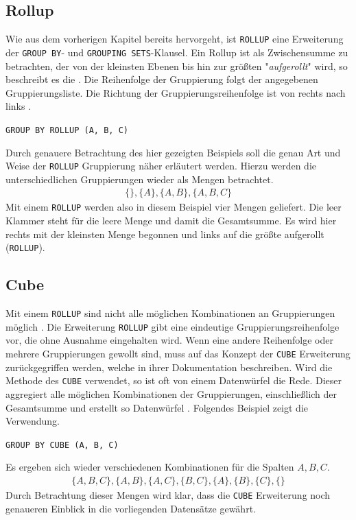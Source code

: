 
\subsection{Rollup}
\label{subsec:rollup} Wie aus dem vorherigen Kapitel bereits hervorgeht, ist \texttt{ROLLUP}
eine Erweiterung der \texttt{GROUP BY}- und \texttt{GROUPING SETS}-Klausel. Ein
Rollup ist als Zwischensumme zu betrachten, der von der kleinsten Ebenen bis hin
zur größten "\textit{aufgerollt}" wird, so beschreibt es die \citet[K. 20]{oracle99}.
Die Reihenfolge der Gruppierung folgt der angegebenen Gruppierungsliste. Die
Richtung der Gruppierungsreihenfolge ist von rechts nach links \citep[vgl.][]{oracle16}.
\begin{center}
	\texttt{GROUP BY ROLLUP (A, B, C)}
\end{center}
Durch genauere Betrachtung des hier gezeigten Beispiels soll die genau Art und
Weise der \texttt{ROLLUP} Gruppierung näher erläutert werden. Hierzu werden die
unterschiedlichen Gruppierungen wieder als Mengen betrachtet.
\begin{align*}
	\{ \}, \{A\}, \{A, B\}, \{A, B, C\}
\end{align*}
Mit einem \texttt{ROLLUP} werden also in diesem Beispiel vier Mengen geliefert. Die
leer Klammer steht für die leere Menge und damit die Gesamtsumme. Es wird hier
rechts mit der kleinsten Menge begonnen und links auf die größte aufgerollt (\texttt{ROLLUP}).

\subsection{Cube}
\label{subsec:cube} Mit einem \texttt{ROLLUP} sind nicht alle möglichen
Kombinationen an Gruppierungen möglich \citep[vgl.][K. 20]{oracle99}. Die
Erweiterung \texttt{ROLLUP} gibt eine eindeutige Gruppierungsreihenfolge vor,
die ohne Ausnahme eingehalten wird. Wenn eine andere Reihenfolge oder mehrere Gruppierungen
gewollt sind, muss auf das Konzept der \texttt{CUBE} Erweiterung zurückgegriffen
werden, welche \citet[K. 20]{oracle99} in ihrer Dokumentation beschreiben. Wird
die Methode des \texttt{CUBE} verwendet, so ist oft von einem Datenwürfel die
Rede. Dieser aggregiert alle möglichen Kombinationen der Gruppierungen,
einschließlich der Gesamtsumme und erstellt so Datenwürfel \citep[vgl.][K. 20]{oracle99}.
Folgendes Beispiel zeigt die Verwendung.
\begin{center}
	\texttt{GROUP BY CUBE (A, B, C)}
\end{center}
Es ergeben sich wieder verschiedenen Kombinationen für die Spalten $A, B, C$.
\begin{align*}
	\{ A, B, C\}, \{A, B\}, \{A, C\}, \{B, C\}, \{A\}, \{B\}, \{C\}, \{ \}
\end{align*}
Durch Betrachtung dieser Mengen wird klar, dass die \texttt{CUBE} Erweiterung
noch genaueren Einblick in die vorliegenden Datensätze gewährt.
